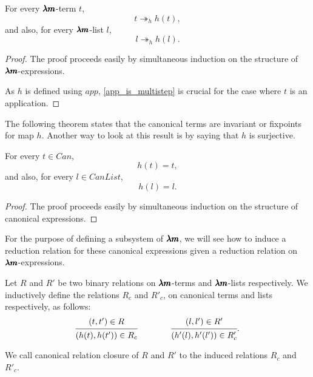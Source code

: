 \begin{proposition}
  \label{h_is_multistep}
  For every $\pmb{\lambda m}$-term $t$, \[ t \twoheadrightarrow_h h(t), \]
  and also, for every $\pmb{\lambda m}$-list $l$, \[ l \twoheadrightarrow_h h(l). \]
\end{proposition}
\begin{proof}
  The proof proceeds easily by simultaneous induction on the structure of $\pmb{\lambda m}$-expressions.

  As $h$ is defined using $app$, \cref{app_is_multistep} is crucial for the case where $t$ is an application. 
\end{proof}

The following theorem states that the canonical terms are invariant or fixpoints for map $h$.
Another way to look at this result is by saying that $h$ is surjective.

\begin{proposition}
  \label{h_fixpoints}
  For every $t \in Can$, \[ h(t) = t, \]
  and also, for every $l \in CanList$, \[ h(l) = l. \]
\end{proposition}
\begin{proof}
  The proof proceeds easily by simultaneous induction on the structure of canonical expressions.
\end{proof}

For the purpose of defining a subsystem of $\pmb{\lambda m}$, we will see how to induce a reduction relation for these canonical expressions given a reduction relation on $\pmb{\lambda m}$-expressions.

\begin{definition}
  \label{canonical_closure}
  Let $R$ and $R'$ be two binary relations on $\pmb{\lambda m}$-terms and $\pmb{\lambda m}$-lists respectively.
  We inductively define the relations $R_c$ and $R'_c$, on canonical terms and lists respectively, as follows:
  \[
    \begin{prooftree}
      \hypo{ (t, t') \in R }
      \infer1{ (h(t), h(t')) \in R_c } 
    \end{prooftree}
    \qquad \qquad
    \begin{prooftree}
      \hypo{ (l, l') \in R' }
      \infer1{ (h'(l), h'(l')) \in R'_c } 
    \end{prooftree}.
  \]

  We call canonical relation closure of $R$ and $R'$ to the induced relations $R_c$ and $R'_c$.
\end{definition}

